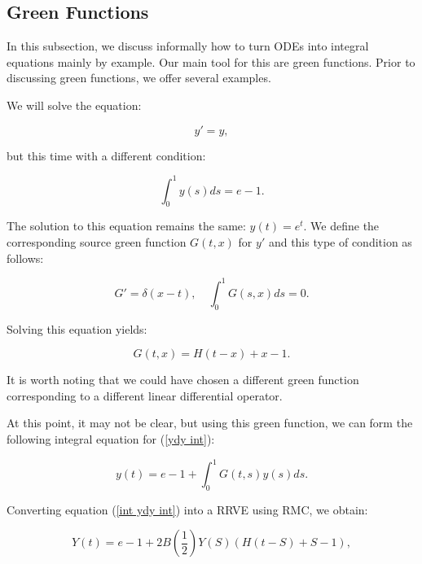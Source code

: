 \documentclass[a4paper,12pt]{article}
\begin{document}
\subsection{Green Functions}
In this subsection, we discuss informally how to turn ODEs into integral equations mainly
by example. Our main tool for this are green functions.
Prior to discussing green functions, we offer several
examples.

\begin{example}[$y'=y$ average condition]
    We will solve the equation:

    \begin{equation} \label{ydy int}
        y' = y,
    \end{equation}

    but this time with a different condition:

    \begin{equation}
        \int_{0}^{1} y(s) ds = e-1.
    \end{equation}

    The solution to this equation remains the same: $y(t) = e^{t}$.
    We define the corresponding source green function $G(t,x)$ for $y'$
    and this type of condition as follows:

    \begin{equation}
        G' = \delta(x-t), \quad \int_{0}^{1} G(s,x) ds = 0.
    \end{equation}

    Solving this equation yields:

    \begin{equation}
        G(t,x) = H(t-x) + x - 1.
    \end{equation}

    It is worth noting that we could have chosen a different
    green function corresponding to a different linear
    differential operator.

    At this point, it may not be clear, but using this green function,
    we can form the following integral equation for (\ref{ydy int}):

    \begin{equation} \label{int ydy int}
        y(t) = e - 1 + \int_{0}^{1} G(t,s) y(s) ds.
    \end{equation}

    Converting equation (\ref{int ydy int}) into a RRVE
    using RMC, we obtain:

    \begin{equation}\label{RRVE ydy int}
        Y(t) = e - 1 + 2B\left(\frac{1}{2}\right)Y(S)(H(t-S)+S-1),
    \end{equation}


\end{example}
\end{document}
